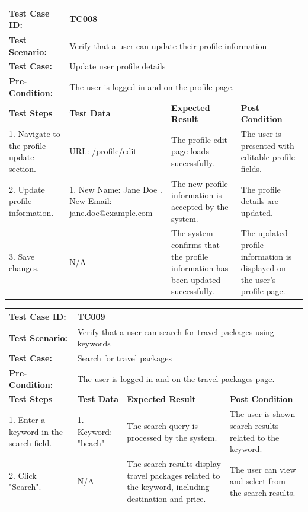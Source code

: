 \documentclass{scrreprt}
\begin{document}
\vspace{1cm}

\begin{longtable}{| m{2cm} | m{5cm} | m{4cm} | m{3cm} |}
\hline

\textbf{Test Case ID:} & \multicolumn{3}{l|}{TC008} \\ \hline
\textbf{Test Scenario:} & \multicolumn{3}{l|}{Verify that a user can update their profile information} \\ \hline
\textbf{Test Case:} & \multicolumn{3}{l|}{Update user profile details} \\ \hline
\textbf{Pre-Condition:} & \multicolumn{3}{l|}{The user is logged in and on the profile page.} \\ \hline
\textbf{Test Steps} & \textbf{Test Data} & \textbf{Expected Result} & \textbf{Post Condition} \\ \hline
1. Navigate to the profile update section. & URL: /profile/edit & The profile edit page loads successfully. & The user is presented with editable profile fields. \\ \hline
2. Update profile information. & 1. New Name: Jane Doe \newline 2. New Email: jane.doe@example.com & The new profile information is accepted by the system. & The profile details are updated. \\ \hline
3. Save changes. & N/A & The system confirms that the profile information has been updated successfully. & The updated profile information is displayed on the user's profile page. \\ \hline
\end{longtable}

\vspace{1cm}

\begin{longtable}{| m{2cm} | m{5cm} | m{4cm} | m{3cm} |}
\hline

\textbf{Test Case ID:} & \multicolumn{3}{l|}{TC009} \\ \hline
\textbf{Test Scenario:} & \multicolumn{3}{l|}{Verify that a user can search for travel packages using keywords} \\ \hline
\textbf{Test Case:} & \multicolumn{3}{l|}{Search for travel packages} \\ \hline
\textbf{Pre-Condition:} & \multicolumn{3}{l|}{The user is logged in and on the travel packages page.} \\ \hline
\textbf{Test Steps} & \textbf{Test Data} & \textbf{Expected Result} & \textbf{Post Condition} \\ \hline
1. Enter a keyword in the search field. & 1. Keyword: "beach" & The search query is processed by the system. & The user is shown search results related to the keyword. \\ \hline
2. Click "Search". & N/A & The search results display travel packages related to the keyword, including destination and price. & The user can view and select from the search results. \\ \hline
\end{longtable}
\end{document}
